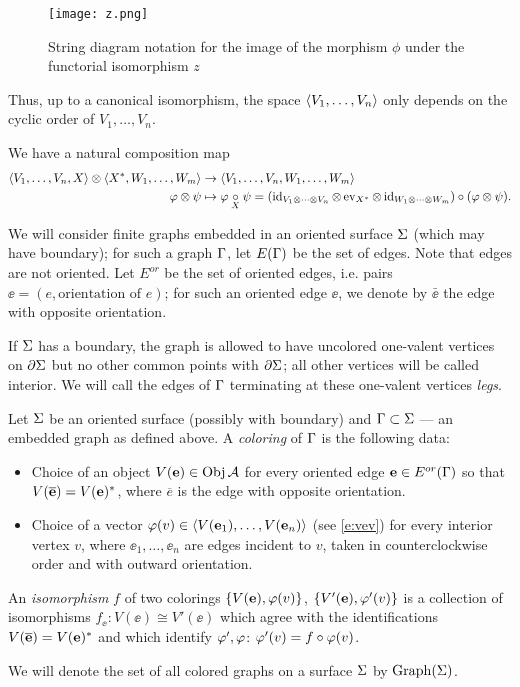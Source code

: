 \begin{figure}
 \centering
 \texttt{[image: z.png]}
 \caption{String diagram notation for the image of the morphism $\phi$ under the functorial isomorphism $z$}
\label{fig:z}
\end{figure}

Thus, up to a canonical
isomorphism, the space $\langle V_1,\dots,V_n\rangle$ only depends on the cyclic order
of $V_1,\dots, V_n$.



We have a natural composition map 
\begin{equation}\label{e:composition}
\begin{aligned}
 \langle V_1,\dots,V_n, X\rangle \otimes \langle X^*, W_1,\dots,
W_m\rangle & \to\langle V_1,\dots,V_n, W_1,\dots, W_m\rangle \\
\varphi\otimes\psi & \mapsto \varphi\underset{\scriptstyle X}{\circ}\psi = (\operatorname{id}_{V_1 \otimes \cdots \otimes V_n} \otimes \operatorname{ev}_{X^*} \otimes \operatorname{id}_{W_1 \otimes \cdots \otimes W_m}) \circ (\varphi\otimes\psi).
\end{aligned}
\end{equation}


We will consider finite  graphs embedded in an oriented surface $\Sigma$
(which may have boundary); for such a
graph $\Gamma$, let $E(\Gamma)$ be the set of edges. Note that edges are not
oriented. Let $E^{or}$ be the set of oriented edges, i.e. pairs $\ee=(e,
\text{orientation of } e)$; for such an oriented edge $\ee$, we denote by
$\bar{\ee}$ the edge with opposite orientation.

If $\Sigma$ has a boundary, the graph is allowed to have uncolored one-valent
vertices on $\partial \Sigma$ but no other common points with $\partial \Sigma$; all
other  vertices will  be called interior.  We will  call the edges of $\Gamma$
terminating at these  one-valent vertices {\em legs}.   
\begin{defn}\label{d:coloring} Let $\Sigma$ be an oriented surface
(possibly with boundary) and $\Gamma\subset \Sigma$ --- an embedded graph as
defined above.  A {\em coloring} of $\Gamma$ is the
following data:

  \begin{itemize}
    \item Choice of an object $V(\mathbf{e})\in \operatorname{Obj} \mathcal{A}$ for every oriented edge
        $\mathbf{e}\in E^{or}(\Gamma)$ so that $V(\overline{\mathbf{e}})=V(\mathbf{e})^*$, where $\overline{e}$ is the edge with opposite orientation.
    \item Choice of a vector $\varphi(v)\in \langle V(\mathbf{e}_1),\dots,V(\mathbf{e}_n)\rangle$ 
      (see \eqref{e:vev})  for    every interior vertex $v$, where 
      $\ee_1, \dots, \ee_n$ are edges incident to $v$, taken in counterclockwise 
      order and with outward orientation. %
\end{itemize}

An {\em isomorphism} $f$ of two colorings $\{V(\mathbf{e}), \varphi(v)\}$, $\{V'(\mathbf{e}), \varphi'(v)\}$ is a collection of isomorphisms $f_\ee \colon V(\ee)\cong 
V'(\ee)$ which  agree  with the identifications $V(\overline{\mathbf{e}})=V(\mathbf{e})^*$ and which identify $\varphi', \varphi$:  $\varphi'(v)=f\circ\varphi(v)$. 

We will denote the set of all colored graphs on a surface $\Sigma$ by
$\operatorname{Graph}(\Sigma)$.
\end{defn}

